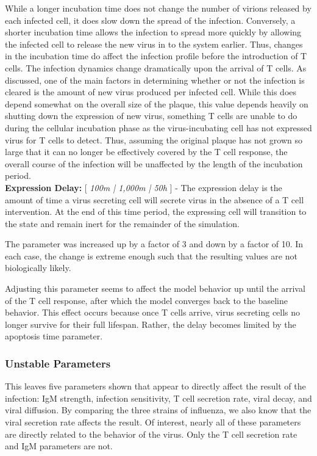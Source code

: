 \documentclass[10pt]{article}
\begin{document}
While a longer incubation time does not change the number of virions released by each infected cell, it does slow down the spread of the infection.  Conversely, a shorter incubation time allows the infection to spread more quickly by allowing the infected cell to release the new virus in to the system earlier.  Thus, changes in the incubation time do affect the infection profile before the introduction of T cells.  The infection dynamics change dramatically upon the arrival of T cells.  As discussed, one of the main factors in determining whether or not the infection is cleared is the amount of new virus produced per infected cell.  While this does depend somewhat on the overall size of the plaque, this value depends heavily on shutting down the expression of new virus, something T cells are unable to do during the cellular incubation phase as the virus-incubating cell has not expressed virus for T cells to detect.  Thus, assuming the original plaque has not grown so large that it can no longer be effectively covered by the T cell response, the overall course of the infection will be unaffected by the length of the incubation period. \\


\textbf{Expression Delay:} [ \textit{100m | 1,000m | 50h} ] - The expression delay is the amount of time a virus secreting cell will secrete virus in the absence of a T cell intervention.  At the end of this time period, the expressing cell will transition to the  state and remain inert for the remainder of the simulation.

The parameter was increased up by a factor of 3 and down by a factor of 10.  In each case, the change is extreme enough such that the resulting values are not biologically likely.  

Adjusting this parameter seems to affect the model behavior up until the arrival of the T cell response, after which the model converges back to the baseline behavior.  This effect occurs because once T cells arrive, virus secreting cells no longer survive for their full lifespan.  Rather, the delay becomes limited by the apoptosis time parameter.  


\subsubsection{Unstable Parameters}

This leaves five parameters shown that appear to directly affect the result of the infection: IgM strength, infection sensitivity, T cell secretion rate, viral decay, and viral diffusion.  By comparing the three strains of influenza, we also know that the viral secretion rate affects the result.  Of interest, nearly all of these parameters are directly related to the behavior of the virus.  Only the T cell secretion rate and IgM parameters are not.  \\
\end{document}
